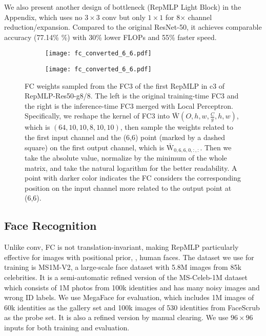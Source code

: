 \documentclass[10pt,twocolumn,letterpaper]{article}
\begin{document}
We also present another design of bottleneck (RepMLP Light Block) in the Appendix, which uses no $3\times3$ conv but only $1\times1$ for 8$\times$ channel reduction/expansion. Compared to the original ResNet-50, it achieves comparable accuracy (77.14\% \%) with 30\% lower FLOPs and 55\% faster speed.




\begin{figure}
	\begin{subfigure}{0.47\linewidth}
		\texttt{[image: fc\_converted\_6\_6.pdf]} 
	\end{subfigure}
	\begin{subfigure}{0.47\linewidth}
		\texttt{[image: fc\_converted\_6\_6.pdf]} 
	\end{subfigure}
	\vspace{-0.05in}
	\caption{FC weights sampled from the FC3 of the first RepMLP in c3 of RepMLP-Res50-g8/8. The left is the original training-time FC3 and the right is the inference-time FC3 merged with Local Perceptron. Specifically, we reshape the kernel of FC3 into $\bar{\mathrm{W}}(O,h,w,\frac{C}{g},h,w)$, which is $(64, 10, 10, 8, 10, 10)$, then sample the weights related to the first input channel and the (6,6) point (marked by a dashed square) on the first output channel, which is $\bar{\mathrm{W}}_{0,6,6,0,:,:}$. Then we take the absolute value, normalize by the minimum of the whole matrix, and take the natural logarithm for the better readability. A point with darker color indicates the FC considers the corresponding position on the input channel more related to the output point at (6,6).}
	\label{fig-visualized}
	\vskip -0.1in
\end{figure}

\subsection{Face Recognition}

Unlike conv, FC is not translation-invariant, making RepMLP particularly effective for images with positional prior, \ie, human faces. The dataset we use for training is MS1M-V2, a large-scale face dataset with 5.8M images from 85k celebrities. It is a semi-automatic refined version of the MS-Celeb-1M dataset \cite{guo2016ms} which consists of 1M photos from 100k identities and has many noisy images and wrong ID labels. We use MegaFace \cite{kemelmacher2016megaface} for evaluation, which includes 1M images of 60k identities as the gallery set and 100k images of 530 identities from FaceScrub as the probe set. It is also a refined version by manual clearing. We use $96\times96$ inputs for both training and evaluation.
\end{document}

